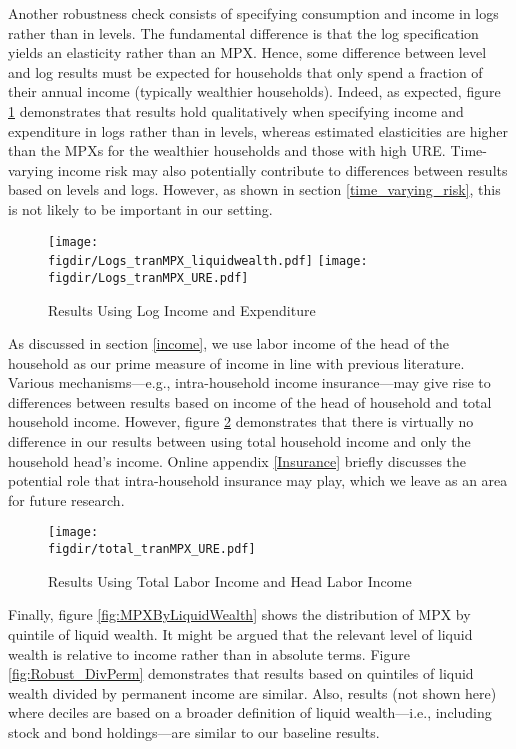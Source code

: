 \documentclass[titlepage]{\econtex}\newcommand{\texname}{ConsumptionHeterogeneity}
\newcommand{\figdir}{../Code/Rcode/Figures/AEJ_revision}
\begin{document}
	Another robustness check consists of specifying consumption and income in logs rather than in levels. The fundamental difference is that the log specification yields an elasticity rather than an MPX. Hence, some difference between level and log results must be expected for households that only spend a fraction of their annual income (typically wealthier households). Indeed, as expected, figure \ref{fig:Robust_Logs} demonstrates that results hold qualitatively when specifying income and expenditure in logs rather than in levels, whereas estimated elasticities are higher than the MPXs for the wealthier households and those with high URE. Time-varying income risk may also potentially contribute to differences between results based on levels and logs. However, as shown in section \ref{time_varying_risk}, this is not likely to be important in our setting.  
	
	\begin{figure} 
		\begin{centering}
			\texttt{[image: \\figdir/Logs\_tranMPX\_liquidwealth.pdf]}
			\texttt{[image: \\figdir/Logs\_tranMPX\_URE.pdf]}
			\caption{Results Using Log Income and Expenditure}
			\label{fig:Robust_Logs}
		\end{centering}
	\end{figure}
	
	As discussed in section \ref{income}, we use labor income of the head of the household as our prime measure of income in line with previous literature. Various mechanisms---e.g., intra-household income insurance---may give rise to differences between results based on income of the head of household and total household income. However, figure \ref{fig:Robust_TotalvsHead} demonstrates that there is virtually no difference in our results between using total household income and only the household head's income. Online appendix \ref{Insurance} briefly discusses the potential role that intra-household insurance may play, which we leave as an area for future research. 
	
	\begin{figure} 
		\begin{centering}
			\texttt{[image: \\figdir/total\_tranMPX\_URE.pdf]}
			\caption{Results Using Total Labor Income and Head Labor Income}
			\label{fig:Robust_TotalvsHead}
		\end{centering}
	\end{figure}
	
	Finally, figure \ref{fig:MPXByLiquidWealth} shows the distribution of MPX by quintile of liquid wealth. It might be argued that the relevant level of liquid wealth is relative to income rather than in absolute terms. Figure \ref{fig:Robust_DivPerm} demonstrates that results based on quintiles of liquid wealth divided by permanent income are similar. Also, results (not shown here) where deciles are based on a broader definition of liquid wealth---i.e., including stock and bond holdings---are similar to our baseline results. 
	
\end{document}
